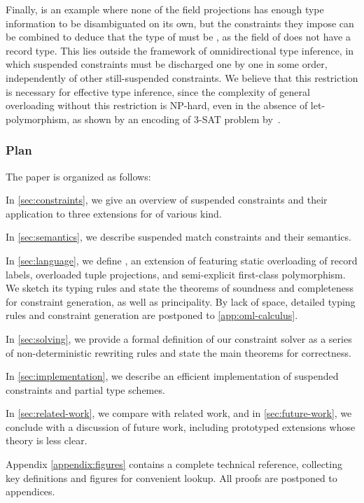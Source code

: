 \documentclass[acmsmall,screen,nonacm,review]{acmart}
\begin{document}
Finally,  is an example where none of the field
projections has enough type information to be disambiguated on its own, but the
constraints they impose can be combined to deduce that the type of
 must be , as the  field of 
does not have a record type. This lies outside the framework of
omnidirectional type inference, in which suspended constraints must be
discharged one by one in some order, independently of other
still-suspended constraints.
%
We believe that this restriction is necessary for effective type inference,
since the complexity of general overloading without this restriction is
NP-hard, even in the absence of let-polymorphism, as shown by an encoding of
3-SAT problem by~\citet*
{Chargueraud-Bodin-Dunfield-Riboulet/jfla2025}.

\subsubsection* {Plan}

The paper is organized as follows:
\begin{enumerate*}[label={}]

\item
  In \cref{sec:constraints}, we give an overview of suspended constraints
  and their application to three extensions for \ML of various kind.

\item
  In \cref{sec:semantics}, we describe suspended match constraints and their semantics.

\item
  In \cref{sec:language}, we define \OML, an extension of \ML featuring static
    overloading of record labels, overloaded tuple projections, and
    semi-explicit first-class polymorphism. We sketch its typing rules and
    state the theorems of soundness and completeness for constraint generation,
    as well as principality. By lack of space, detailed typing rules and constraint
    generation are postponed to \cref {app:oml-calculus}.

\item
  In \cref{sec:solving}, we provide a formal definition of our constraint
  solver as a series of non-deterministic rewriting rules and state the main
  theorems for correctness.

\item
  In \cref{sec:implementation}, we describe an efficient implementation
    of suspended constraints and partial type schemes.

\item
  In \cref{sec:related-work}, we compare with related work,
  and in \cref{sec:future-work}, we conclude with a discussion of future work,
  including prototyped extensions whose theory is less clear.

\end{enumerate*}
Appendix \cref{appendix:figures} contains a complete technical reference,
collecting key definitions and figures for convenient lookup. All proofs are
postponed to appendices.
\end{document}
